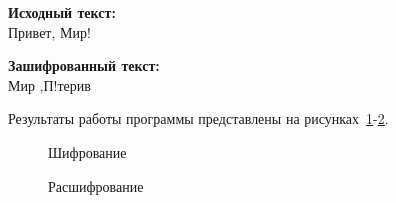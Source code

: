 \textbf{Исходный текст:} \\
    Привет, Мир!

\textbf{Зашифрованный текст:} \\
    Мир ,П!терив

Результаты работы программы представлены на рисунках~\ref{ris:encode-test-2}-\ref{ris:decode-test-2}.

\vspace{\baselineskip}
\begin{figure}[H]
    \caption{Шифрование}
\label{ris:encode-test-2}
\end{figure}

\vspace{\baselineskip}
\begin{figure}[H]
    \caption{Расшифрование}
\label{ris:decode-test-2}
\end{figure}
